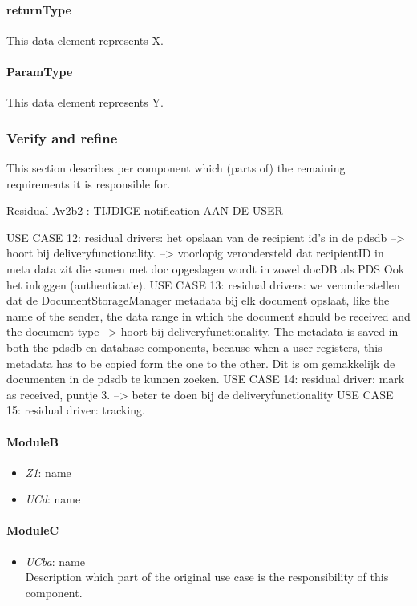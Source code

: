 \documentclass[a4paper,10pt]{article}
\begin{document}
\paragraph{returnType} This data element represents X.

\paragraph{ParamType} This data element represents Y.

\subsubsection{Verify and refine}
This section describes per component which (parts of) the remaining
requirements it is responsible for.

Residual Av2b2 : TIJDIGE notification AAN DE USER

USE CASE 12: residual drivers: het opslaan van de recipient id's in de pdsdb --> hoort bij deliveryfunctionality. --> voorlopig verondersteld dat recipientID in meta data zit die samen met doc opgeslagen wordt in zowel docDB als PDS
Ook het inloggen (authenticatie).
USE CASE 13:  residual drivers: we veronderstellen dat de DocumentStorageManager metadata bij elk document opslaat, like the name of the sender, the data range in which the document should be received and the document type --> hoort bij deliveryfunctionality.
The metadata is saved in both the pdsdb en database components, because when a user registers, this metadata has to be copied form the one to the other. Dit is om gemakkelijk de documenten in de pdsdb te kunnen zoeken.
USE CASE 14:  residual driver: mark as received, puntje 3. --> beter te doen bij de deliveryfunctionality
USE CASE 15:  residual driver: tracking.

\paragraph{ModuleB}
\begin{itemize}
    \item \emph{Z1}: name
    \item \emph{UCd}: name
\end{itemize}

\paragraph{ModuleC}
\begin{itemize}
    \item \emph{UCba}: name\\Description which part of the original use case is
        the responsibility of this component.
\end{itemize}
\end{document}
